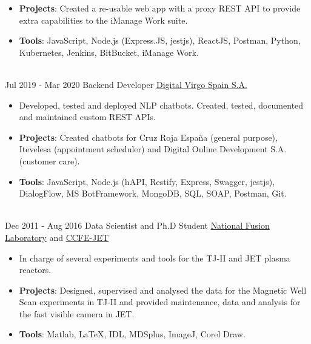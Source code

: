 \documentclass[letterpaper]{twentysecondcv} %
\begin{document}
\begin{twenty}
{{\begin{itemize}
        \item \textbf{Projects}: Created a re-usable web app with a proxy REST API to provide extra capabilities to the iManage Work suite.
        \item \textbf{Tools}: JavaScript, Node.js (Express.JS, jestjs), ReactJS, Postman, Python, Kubernetes, Jenkins, BitBucket, iManage Work. 
    \end{itemize}}
        }
    \\   
    \twentyitem
   		{Jul 2019 -}
		{Mar 2020}
        {Backend Developer}
        {\href{https://www.digitalvirgo.com/}{Digital Virgo Spain S.A.}}
        {}
        {
        {\begin{itemize}
        \item Developed, tested and deployed NLP chatbots. Created, tested, documented and maintained custom REST APIs.
        \item \textbf{Projects}: Created chatbots for Cruz Roja Espa\~na (general purpose), Itevelesa (appointment scheduler) and Digital Online Development S.A. (customer care).
        \item \textbf{Tools}: JavaScript, Node.js (hAPI, Restify, Express, Swagger, jestjs), DialogFlow, MS BotFramework, MongoDB, SQL, SOAP, Postman, Git.
    \end{itemize}}
        }
     \\
     \twentyitem
   		{Dec 2011 -}
		{Aug 2016}
        {Data Scientist and Ph.D Student}
        {\href{http://www.fusion.ciemat.es/home/}{National Fusion Laboratory} and \href{https://www.euro-fusion.org/devices/jet/}{CCFE-JET}}
        {}
        {
        \begin{itemize}
        \item In charge of several experiments and tools for the TJ-II and JET plasma reactors. 
        \item \textbf{Projects}: Designed, supervised and analysed the data for the Magnetic Well Scan experiments in TJ-II and provided maintenance, data and analysis for the fast visible camera in JET.
        \item \textbf{Tools}: Matlab, \LaTeX, IDL, MDSplus, ImageJ, Corel Draw.
    \end{itemize}
    	}
        
\end{twenty}

\end{document}
